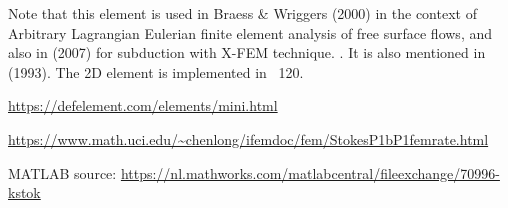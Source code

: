 Note that this element is used in Braess \& Wriggers (2000) \cite{brwr00} 
in the context of Arbitrary Lagrangian Eulerian 
finite element analysis of free surface flows, and also 
in \textcite{zldf07} (2007) for subduction with X-FEM technique. 
. It is also mentioned in \textcite{nath93} (1993).
The 2D element is implemented in \stone~120.

\begin{center}
\url{https://defelement.com/elements/mini.html}
\end{center}

\url{https://www.math.uci.edu/~chenlong/ifemdoc/fem/StokesP1bP1femrate.html}

MATLAB source: \url{https://nl.mathworks.com/matlabcentral/fileexchange/70996-kstok}
